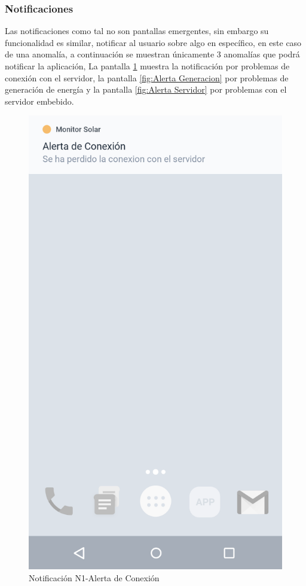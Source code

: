 \subsubsection{Notificaciones}\label{Notificaciones}

Las notificaciones como tal no son pantallas emergentes, sin embargo su funcionalidad es similar, notificar al usuario sobre algo en específico, en este caso de una anomalía, a continuación se muestran únicamente 3 anomalías que podrá notificar la aplicación, La pantalla \ref{fig:Alerta Conexion} muestra la notificación por problemas de conexión con el servidor, la pantalla \ref{fig:Alerta Generacion} por problemas de generación de energía y la pantalla \ref{fig:Alerta Servidor} por problemas con el servidor embebido. 

\begin{figure}[H]
	\centering
	\includegraphics[scale=0.70]{Capitulo4/software/submodulos/images/notif_con.png}
	\caption{Notificación N1-Alerta de Conexión}
	\label{fig:Alerta Conexion}
\end{figure}

